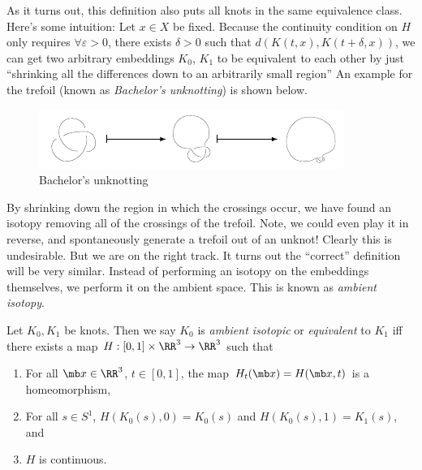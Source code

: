 As it turns out, this definition also puts all knots in the same
equivalence class. Here's some intuition: Let $x \in X$ be fixed.
Because the continuity condition on $H$ only requires $\forall
\varepsilon > 0$, there exists $\delta > 0$ such that $d(K(t, x), K(t
+ \delta, x))$, we can get two arbitrary embeddings $K_0$, $K_1$ to be
equivalent to each other by just ``shrinking all the differences down
to an arbitrarily small region'' An example for the trefoil (known as
\emph{Bachelor's unknotting}) is shown below.

\begin{figure}[H]
  \centering
  \includegraphics[scale=2]{figures/background/bachelor-unknotting.pdf}
  \caption{Bachelor's unknotting}
\end{figure}
By shrinking down the region in which the crossings occur, we have
found an isotopy removing all of the crossings of the trefoil. Note,
we could even play it in reverse, and spontaneously generate a trefoil
out of an unknot! Clearly this is undesirable. But we are on the right
track. It turns out the ``correct'' definition will be very similar.
Instead of performing an isotopy on the embeddings themselves, we
perform it on the ambient space. This is known as \emph{ambient
  isotopy}.
\begin{definition}
  Let $K_0, K_1$ be knots. Then we say $K_0$ is \emph{ambient
    isotopic} or \emph{equivalent} to $K_1$ iff there exists a map $H
  : [0,1] \times \RR^3 \to \RR^3$ such that
  \begin{enumerate}
    \item For all $\mb x \in \RR^3$, $t \in [0,1]$, the map $H_t(\mb x)
      = H(\mb x, t)$ is a homeomorphism,
    \item For all $s \in S^1$, $H(K_0(s), 0) = K_0(s)$ and
      $H(K_0(s),1) = K_1(s)$, and
    \item $H$ is continuous. \qedhere
  \end{enumerate}
\end{definition}
